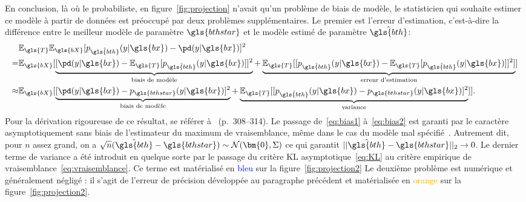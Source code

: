 En conclusion, là où le probabiliste, en figure~\ref{fig:projection} n'avait qu'un problème de biais de modèle, le statisticien qui souhaite estimer ce modèle à partir de données est préoccupé par deux problèmes supplémentaires. Le premier est l'erreur d'estimation, c'est-à-dire la différence entre le meilleur modèle de paramètre $\gls{bthstar}$ et le modèle estimé de paramètre $\hat{\gls{bth}}$:
\begin{align}
 & \mathbb{E}_{\gls{T}} \mathbb{E}_{\gls{bX}} [p_{\hat{\gls{bth}}}(y| \gls{bx}) - \pd(y| \gls{bx})]^2  \nonumber \\
= & \mathbb{E}_{\gls{bX}} [ \underbrace{[\pd(y| \gls{bx}) - \mathbb{E}_{\gls{T}} [ p_{\hat{\gls{bth}}}(y| \gls{bx})]]^2}_{\text{biais de modèle}} + \underbrace{\mathbb{E}_{\gls{T}} [[ p_{\hat{\gls{bth}}}(y| \gls{bx}) - \mathbb{E}_{\gls{T}} [ p_{\hat{\gls{bth}}}(y| \gls{bx}) ]]^2]}_{\text{erreur d'estimation}} ] \label{eq:bias1} \\
\approx & \mathbb{E}_{\gls{bX}} [ \underbrace{[\pd(y| \gls{bx}) - p_{\gls{bthstar}}(y| \gls{bx})]^2}_{\text{biais de modèle}} + \underbrace{\mathbb{E}_{\gls{T}} [[ p_{\hat{\gls{bth}}}(y| \gls{bx}) - p_{\gls{bthstar}}(y| \gls{bx})  ]^2}_{\text{variance}} ]]. \label{eq:bias2}
\end{align}
Pour la dérivation rigoureuse de ce résultat, se référer à~\cite{schutze2008introduction} (p.\ 308–314). Le passage de~\ref{eq:bias1} à~\ref{eq:bias2} est garanti par le caractère asymptotiquement sans biais de l'estimateur du maximum de vraisemblance, même dans le cas du modèle mal spécifié~\cite{white1982maximum}. Autrement dit, pour $n$ assez grand, on a $\sqrt{n} (\hat{\gls{bth}} - \gls{bthstar}) \sim \mathcal{N}(\bm{0} , \Sigma)$ ce qui garantit $|| \hat{\gls{bth}} - \gls{bthstar}||_2 \to 0$.
Le dernier terme de variance a été introduit en quelque sorte par le passage du critère KL asymptotique~\eqref{eq:KL} au critère empirique de vraisemblance~\eqref{eq:vraisemblance}. Ce terme est matérialisé en \textcolor{blue}{bleu} sur la figure~\ref{fig:projection2}
Le deuxième problème est numérique et généralement négligé : il s'agit de l'erreur de précision développée au paragraphe précédent et matérialisée en \textcolor{orange}{orange} sur la figure~\ref{fig:projection2}.

